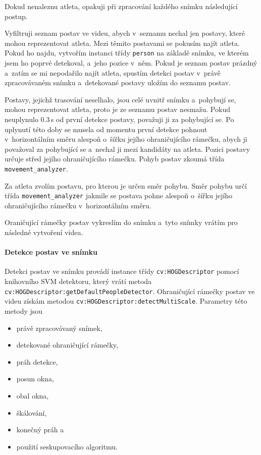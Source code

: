 Dokud nenaleznu atleta, opakuji při zpracování každého snímku následující postup.

Vyfiltruji seznam postav ve videu, abych v~seznamu nechal jen postavy, které mohou reprezentovat atleta. Mezi těmito postavami se pokusím najít atleta. Pokud ho najdu, vytvořím instanci třídy \texttt{person} na základě snímku, ve kterém jsem ho poprvé detekoval, a~jeho pozice v~něm. Pokud je seznam postav prázdný a~zatím se mi nepodařilo najít atleta, spustím detekci postav v~právě zpracovávaném snímku a~detekované postavy uložím do seznamu postav.

Postavy, jejichž trasování neselhalo, jsou celé uvnitř snímku a~pohybují se, mohou reprezentovat atleta, proto je ze seznamu postav nesmažu. Pokud neuplynulo $0.3$\,\rm s od první detekce postavy, považuji ji za pohybující se. Po uplynutí této doby se musela od momentu první detekce pohnout v~horizontálním směru alespoň o~šířku jejího ohraničujícího rámečku, abych ji považoval za pohybující se a~nechal ji mezi kandidáty na atleta. Pozici postavy určuje střed jejího ohraničujícího rámečku. Pohyb postav zkoumá třída \texttt{movement\_analyzer}.

Za atleta zvolím postavu, pro kterou je určen směr pohybu. Směr pohybu určí třída \texttt{movement\_analyzer} jakmile se postava pohne alespoň o~šířku jejího ohraničujícího rámečku v~horizontálním směru.

Oraničující rámečky postav vykreslím do snímku a~tyto snímky vrátím pro následné vytvoření videa.

\paragraph{Detekce postav ve snímku}

Detekci postav ve snímku provádí instance třídy \texttt{cv\::HOGDescriptor} pomocí knihovního SVM detektoru, který vrátí metoda \texttt{cv\::HOGDescriptor\::getDefaultPeopleDetector}. Ohraničující rámečky postav ve videu získám metodou \texttt{cv\::HOGDescriptor\::detectMultiScale}. Parametry této metody jsou
\begin{itemize}
    \item právě zpracovávaný snímek,
    \item detekované ohraničující rámečky,
    \item práh detekce,
    \item posun okna,
    \item obal okna,
    \item škálování,
    \item konečný práh a
    \item použití seskupovacího algoritmu.
\end{itemize}

